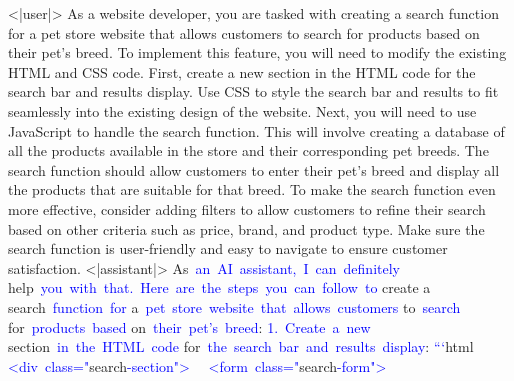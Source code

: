 \documentclass{article}
\begin{document}
\begin{tcolorbox}[colframe=black,colback=white]
<|user|>
As a website developer, you are tasked with creating a search function for a pet store website that allows customers to search for products based on their pet's breed. To implement this feature, you will need to modify the existing HTML and CSS code. 
First, create a new section in the HTML code for the search bar and results display. Use CSS to style the search bar and results to fit seamlessly into the existing design of the website. 
Next, you will need to use JavaScript to handle the search function. This will involve creating a database of all the products available in the store and their corresponding pet breeds. The search function should allow customers to enter their pet's breed and display all the products that are suitable for that breed. 
To make the search function even more effective, consider adding filters to allow customers to refine their search based on other criteria such as price, brand, and product type. Make sure the search function is user-friendly and easy to navigate to ensure customer satisfaction.
<|assistant|>
As\textcolor{blue}{~an}\textcolor{blue}{~AI}\textcolor{blue}{~assistant}\textcolor{blue}{,}\textcolor{blue}{~I}\textcolor{blue}{~can}\textcolor{blue}{~definitely} help\textcolor{blue}{~you}\textcolor{blue}{~with}\textcolor{blue}{~that}\textcolor{blue}{.}\textcolor{blue}{~Here}\textcolor{blue}{~are}\textcolor{blue}{~the}\textcolor{blue}{~steps}\textcolor{blue}{~you}\textcolor{blue}{~can}\textcolor{blue}{~follow}\textcolor{blue}{~to} create a search\textcolor{blue}{~function}\textcolor{blue}{~for} a\textcolor{blue}{~pet}\textcolor{blue}{~store}\textcolor{blue}{~website}\textcolor{blue}{~that}\textcolor{blue}{~allows}\textcolor{blue}{~customers} to\textcolor{blue}{~search} for\textcolor{blue}{~products}\textcolor{blue}{~based} on\textcolor{blue}{~their}\textcolor{blue}{~pet}\textcolor{blue}{'s}\textcolor{blue}{~breed}:
\textcolor{blue}{1}\textcolor{blue}{.}\textcolor{blue}{~Create}\textcolor{blue}{~a}\textcolor{blue}{~new} section\textcolor{blue}{~in}\textcolor{blue}{~the}\textcolor{blue}{~HTML}\textcolor{blue}{~code} for\textcolor{blue}{~the}\textcolor{blue}{~search}\textcolor{blue}{~bar}\textcolor{blue}{~and}\textcolor{blue}{~results}\textcolor{blue}{~display}:
\textcolor{blue}{```}html\textcolor{blue}{
}\textcolor{blue}{<div}\textcolor{blue}{~class}\textcolor{blue}{="}search\textcolor{blue}{-section}\textcolor{blue}{">
}\textcolor{blue}{~}\textcolor{blue}{~<}\textcolor{blue}{form}\textcolor{blue}{~class}\textcolor{blue}{="}search\textcolor{blue}{-form}\textcolor{blue}{">
}
\end{tcolorbox}
\end{document}

